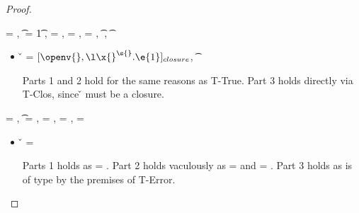 \begin{lemma}
\begin{enumerate}
\begin{proof}
\begin{case}[T-Multi]
\end{case}

\begin{case}[T-Abs] \e{} = {\abs {\x{}} {\s{}} {}},
  \t{} = {\ArrowOne {\x{}} {\s{}}
                                                      {\t{1}}
                                                      {
                                                                  {}}
                                                      {}},
  {\thenprop{\prop{}}}= {\topprop{}},
  {\elseprop{\prop{}}}= {\botprop{}},
  {\object{}}= {\emptyobject{}},
{ \judgement {\propenv{}, {\isprop {\s{}} {\x{}}}}
            { {\t{}}}
             {
                         {}}
             {}},
\judgement {\propenv{}} { {\t{}}}
                 {\filterset {\thenprop {\prop{}}}
                             {\elseprop {\prop{}}}}
                 {\object{}}

  \begin{itemize}
    \item[]
      \begin{subcase}[B-Abs]
        \v{} = ${\closure {\openv{}} {\abs {\x{}} {\s{}} {\e{1}}}}$,
          { \opsem {\openv{}}
                   {\abs {\x{}} {\t{}} {}}
                   {\closure {\openv{}} {\abs {\x{}} {\s{}} {}}}}

        Parts 1 and 2 hold for the same reasons as T-True.
        Part 3 holds directly via T-Clos, since \v{} must be a closure.
      \end{subcase}
  \end{itemize}
\end{case}

\begin{case}[T-Error]
  \e{} = ,
  \t{} = \Bot,
  \thenprop{\prop{}} = \botprop{}, \elseprop{\prop{}} = \botprop{}, \object{} = \emptyobject{}


  \begin{itemize}
    \item[]
      \begin{subcase}[BE-Error] 
        \v{} = 

        Parts 1 holds as \object{} = \emptyobject{}.
        Part 2 holds vaculously as \thenprop{\prop{}} = \botprop{} and \elseprop{\prop{}} = \botprop{}.
        Part 3 holds as  is of type \Bot by the premises of T-Error.
      \end{subcase}
  \end{itemize}
\end{case}


\end{proof}
\end{enumerate}
\end{lemma}
